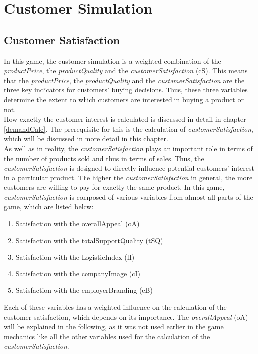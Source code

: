 \section{Customer Simulation} \label{sec:customsim}

\subsection{Customer Satisfaction}
In this game, the customer simulation is a weighted combination of the \textit{productPrice}, the \textit{productQuality} and the \textit{customerSatisfaction} (\gls{cS}).
This means that the \textit{productPrice}, the \textit{productQuality} and the \textit{customerSatisfaction} are the three key indicators for customers' buying decisions. Thus, these three variables determine the extent to which customers are interested in buying a product or not.\\
How exactly the customer interest is calculated is discussed in detail in chapter \ref{demandCalc}. The prerequisite for this is the calculation of \textit{customerSatisfaction}, which will be discussed in more detail in this chapter.\\
As well as in reality, the \textit{customerSatisfaction} plays an important role in terms of the number of products sold and thus in terms of sales. \cite{deptolla_effects_2004}
Thus, the \textit{customerSatisfaction} is designed to directly influence potential customers' interest in a particular product. The higher the \textit{customerSatisfaction} in general, the more customers are willing to pay for exactly the same product. 
In this game, \textit{customerSatisfaction} is composed of various variables from almost all parts of the game, which are listed below:
\begin{enumerate}
      \item Satisfaction with the overallAppeal (oA)
      \item Satisfaction with the totalSupportQuality (tSQ)
      \item Satisfaction with the LogisticIndex (lI)
      \item Satisfaction with the companyImage (cI)
      \item Satisfaction with the employerBranding (eB)
\end{enumerate}
Each of these variables has a weighted influence on the calculation of the customer satisfaction, which depends on its importance.
The \textit{overallAppeal} (oA) will be explained in the following, as it was not used earlier in the game mechanics like all the other variables used for the calculation of the \textit{customerSatisfaction}.

